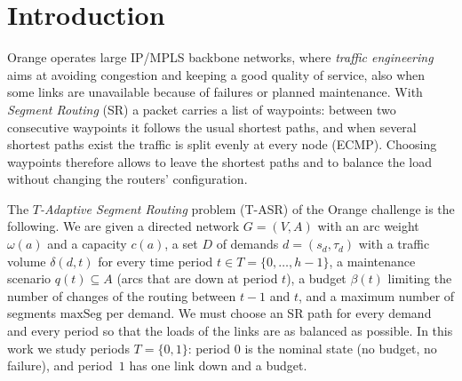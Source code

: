 \section{Introduction}
Orange operates large IP/MPLS backbone networks, where \emph{traffic engineering} aims at avoiding congestion and keeping a good quality of service, also when some links are unavailable because of failures or planned maintenance. With \emph{Segment Routing} (SR) a packet carries a list of waypoints: between two consecutive waypoints it follows the usual shortest paths, and when several shortest paths exist the traffic is split evenly at every node (ECMP). Choosing waypoints therefore allows to leave the shortest paths and to balance the load without changing the routers' configuration.

The \emph{$T$-Adaptive Segment Routing} problem (T-ASR) of the Orange challenge is the following. We are given a directed network $G=(V,A)$ with an arc weight $\omega(a)$ and a capacity $c(a)$, a set $D$ of demands $d=(s_d,\tau_d)$ with a traffic volume $\delta(d,t)$ for every time period $t\in T=\{0,\dots,h-1\}$, a maintenance scenario $q(t)\subseteq A$ (arcs that are down at period $t$), a budget $\beta(t)$ limiting the number of changes of the routing between $t-1$ and $t$, and a maximum number of segments $\mathrm{maxSeg}$ per demand. We must choose an SR path for every demand and every period so that the loads of the links are as balanced as possible. In this work we study periods $T=\{0,1\}$: period $0$ is the nominal state (no budget, no failure), and period~$1$ has one link down and a budget.
